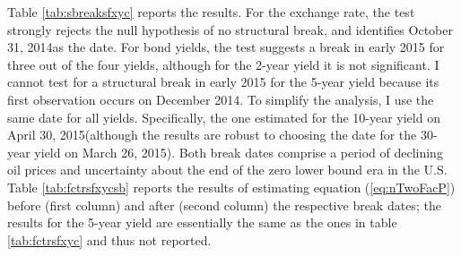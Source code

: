 \documentclass[a4paper, 12pt]{article}
\providecommand{\breakdatefx}{October 31, 2014}
\providecommand{\breakdateyc}{April 30, 2015}
\begin{document}
Table \ref{tab:sbreaksfxyc} reports the results. For the exchange rate, the test strongly rejects the null hypothesis of no structural break, and identifies \breakdatefx as the date. For bond yields, the test suggests a break in early 2015 for three out of the four yields, although for the 2-year yield it is not significant. I cannot test for a structural break in early 2015 for the 5-year yield because its first observation occurs on December 2014. To simplify the analysis, I use the same date for all yields. Specifically, the one estimated for the 10-year yield on \breakdateyc  (although the results are robust to choosing the date for the 30-year yield on March 26, 2015). Both break dates comprise a period of declining oil prices and uncertainty about the end of the zero lower bound era in the U.S. Table \ref{tab:fctrsfxycsb} reports the results of estimating equation (\ref{eq:nTwoFacP}) before (first column) and after (second column) the respective break dates; the results for the 5-year yield are essentially the same as the ones in table \ref{tab:fctrsfxyc} and thus not reported. 
\end{document}
